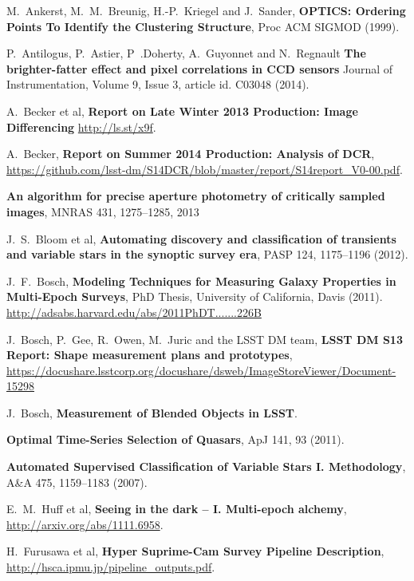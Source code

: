 \documentclass[DM,lsstdraft,SDD]{lsstdoc}
\begin{document}
\begin{thebibliography}{10}

 M.~Ankerst, M.~M.~Breunig, H.-P.~Kriegel and J.~Sander,
  \textbf{OPTICS: Ordering Points To Identify the Clustering Structure},
  Proc ACM SIGMOD (1999).

 P.~Antilogus, P.~Astier, P~.Doherty, A.~Guyonnet and N.~Regnault
  \textbf{The brighter-fatter effect and pixel correlations in CCD sensors}
  Journal of Instrumentation, Volume 9, Issue 3, article id. C03048 (2014).

 A.~Becker et al,
  \textbf{Report on Late Winter 2013 Production: Image Differencing}
  \url{http://ls.st/x9f}.

 A.~Becker,
  \textbf{Report on Summer 2014 Production: Analysis of DCR},
  \url{https://github.com/lsst-dm/S14DCR/blob/master/report/S14report_V0-00.pdf}.

  \textbf{An algorithm for precise aperture photometry of critically sampled images},
  MNRAS 431, 1275--1285, 2013

 J.~S.~Bloom et al,
  \textbf{Automating discovery and classification of transients and variable stars in the synoptic survey era},
  PASP 124, 1175--1196 (2012).

 J.~F.~Bosch,
  \textbf{Modeling Techniques for Measuring Galaxy Properties in Multi-Epoch Surveys},
  PhD Thesis, University of California, Davis (2011). \url{http://adsabs.harvard.edu/abs/2011PhDT.......226B}

 J.~Bosch, P.~Gee, R.~Owen, M.~Juric and the LSST DM team,
  \textbf{LSST DM S13 Report: Shape measurement plans and prototypes},
  \url{https://docushare.lsstcorp.org/docushare/dsweb/ImageStoreViewer/Document-15298}

 J.~Bosch,
  \textbf{Measurement of Blended Objects in LSST}.

  \textbf{Optimal Time-Series Selection of Quasars},
  ApJ 141, 93 (2011).

  \textbf{Automated Supervised Classification of Variable Stars I. Methodology},
  A\&A 475, 1159–1183 (2007).

 E.~M.~Huff et al,
  \textbf{Seeing in the dark -- I. Multi-epoch alchemy},
  \url{http://arxiv.org/abs/1111.6958}.

 H.~Furusawa et al,
  \textbf{Hyper Suprime-Cam Survey Pipeline Description},
  \url{http://hsca.ipmu.jp/pipeline_outputs.pdf}.


\end{thebibliography}
\end{document}
